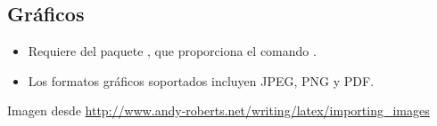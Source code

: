 \documentclass{beamer}
\begin{document}
\subsection{Gráficos}
\begin{frame}[fragile]{\insertsubsection}
  \begin{itemize}
  \item Requiere del paquete , que proporciona el
    comando .
  \item Los formatos gráficos soportados incluyen JPEG, PNG y PDF.
  \end{itemize}
  
  \tiny{Imagen desde \url{http://www.andy-roberts.net/writing/latex/importing_images}}
\end{frame}
\end{document}

